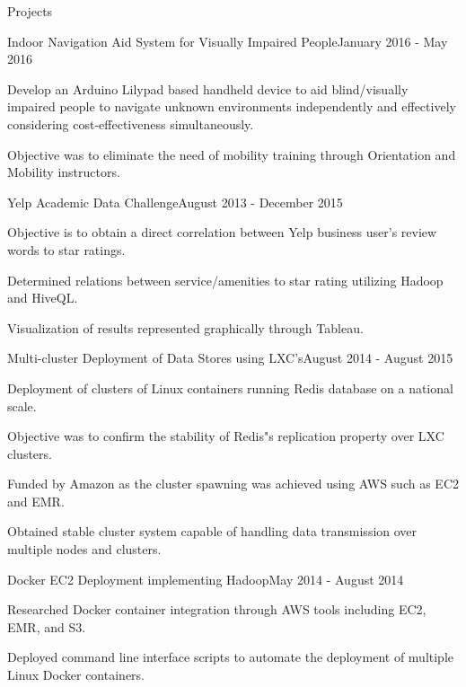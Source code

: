 \documentclass{resume} %
\begin{document}
\begin{rSection}{Projects}

\begin{rSubsection}{Indoor Navigation Aid System for Visually Impaired People}{January 2016 - May 2016}{}{}
\item Develop an Arduino Lilypad based handheld device to aid blind/visually impaired people to navigate unknown environments independently and effectively considering cost-effectiveness simultaneously.
\item Objective was to eliminate the need of mobility training through Orientation and Mobility instructors.
\end{rSubsection}

\begin{rSubsection}{Yelp Academic Data Challenge}{August 2013 - December 2015}{}{}
\item Objective is to obtain a direct correlation between Yelp business user's review words to star ratings.
\item Determined relations between service/amenities to star rating utilizing Hadoop and HiveQL.
\item Visualization of results represented graphically through Tableau.
\end{rSubsection}

\begin{rSubsection}{Multi-cluster Deployment of Data Stores using LXC's}{August 2014 - August 2015}{}{}
\item Deployment of clusters of Linux containers running Redis database on a national scale.
\item Objective was to confirm the stability of Redis"s replication property over LXC clusters.
\item Funded by Amazon as the cluster spawning was achieved using AWS such as EC2 and EMR.
\item Obtained stable cluster system capable of handling data transmission over multiple nodes and clusters.
\end{rSubsection}

\begin{rSubsection}{Docker EC2 Deployment implementing Hadoop}{May 2014 - August 2014}{}{}
\item Researched Docker container integration through AWS tools including EC2, EMR, and S3. 
\item Deployed command line interface scripts to automate the deployment of multiple Linux Docker containers.
\end{rSubsection}


\end{rSection}
\end{document}
